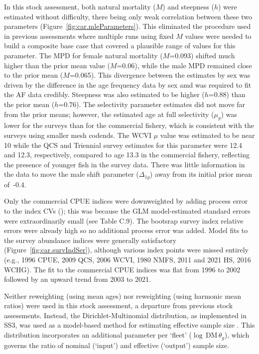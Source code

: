 \documentclass[11pt]{book}
\begin{document}
In this \SPC{} stock assessment, both natural mortality ($M$) and steepness ($h$) were estimated without difficulty, there being only weak correlation between these two parameters (Figure~\ref{fig:car.mleParameters}).
This eliminated the procedure used in previous assessments where multiple runs using fixed $M$ values were needed to build a composite base case that covered a plausible range of values for this parameter.
The MPD for female natural mortality ($M$=0.093) shifted much higher than the prior mean value ($M$=0.06), while the male MPD remained close to the prior mean ($M$=0.065).
This divergence between the estimates by sex was driven by the difference in the age frequency data by sex amd was required to fit the AF data credibly.
Steepness was also estimated to be higher ($h$=0.88) than the prior mean ($h$=0.76).
The selectivity parameter estimates did not move far from the prior means; however, the estimated age at full selectivity ($\mu_g$) was lower for the surveys than for the commercial fishery, which is consistent with the surveys using smaller mesh codends.
The WCVI $\mu$ value was estimated to be near 10 while the QCS and Triennial survey estimates for this parameter were 12.4 and 12.3, respectively, compared to age 13.3 in the commercial fishery, reflecting the presence of younger fish in the survey data.
There was little information in the data to move the male shift parameter ($\Delta_{1g}$) away from its initial prior mean of~-0.4.

Only the commercial CPUE indices were downweighted by adding process error to the index CVs (\cvpro); this was because the GLM model-estimated standard errors were extraordinarily small (see Table C.9).
The bootsrap survey index relative errors were already high so no additional process error was added.
Model fits to the survey abundance indices were generally satisfactory (Figure~\ref{fig:car.survIndSer}), although various index points were missed entirely (e.g., 1996 CPUE, 2009 QCS, 2006 WCVI, 1980 NMFS, 2011 and 2021 HS, 2016 WCHG).
The fit to the commercial CPUE indices was flat from 1996 to 2002 followed by an upward trend from 2003 to 2021.

Neither \citet{Francis:2011} reweighting (using mean ages) nor \citet{McAllister-Ianelli:1997} reweighting (using harmonic mean ratios) were used in this stock assessment, a departure from previous stock assessments.
Instead, the Dirichlet-Multinomial distribution, as implemented in SS3, was used as a model-based method for estimating effective sample size \citep{Thorson-etal:2017}.
This distribution incorporates an additional parameter per `fleet' ($\log\,\text{DM}\,\theta_g$), which governs the ratio of nominal (`input') and effective (`output') sample size.
\end{document}
